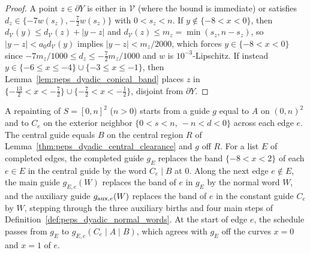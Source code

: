 \begin{proof}\leanok
    A point $z\in\partial Y$ is either in $\mathcal V$ (where the bound is
    immediate) or satisfies $d_z\in\{-7w(s_z),-\tfrac72w(s_z)\}$ with $0<s_z<n$.
    If $y\notin\{-8<x<0\}$, then $d_{\mathcal V}(y)\le d_{\mathcal V}(z)+|y-z|$
    and $d_{\mathcal V}(z)\le m_z=\min(s_z,n-s_z)$, so
    $|y-z|<a_0d_{\mathcal V}(y)$ implies $|y-z|<m_z/2000$, which forces
    $y\in\{-8<x<0\}$ since $-7m_z/1000\le d_z\le-\tfrac72m_z/1000$ and $w$ is
    $10^{-3}$-Lipschitz. If instead
    $y\in\{-6\le x\le-4\}\cup\{-3\le x\le-1\}$, then
    Lemma~\ref{lem:peps_dyadic_conical_band} places $z$ in
    $\{-\tfrac{13}2<x<-\tfrac72\}\cup\{-\tfrac72<x<-\tfrac12\}$, disjoint from
    $\partial Y$.
\end{proof}

\begin{definition}
    \label{def:peps_dyadic_schedule}
    \leanok
    A repainting of $S=[0,n]^2$ ($n>0$) starts from a guide $g$ equal to $A$ on
    $(0,n)^2$ and to $C_e$ on the exterior neighbor $\{0<s<n,\ -n<d<0\}$ across
    each edge $e$. The central guide equals $B$ on the central region $R$ of
    Lemma~\ref{thm:peps_dyadic_central_clearance} and $g$ off $R$. For a list
    $E$ of completed edges, the completed guide $g_E$ replaces the band
    $\{-8<x<2\}$ of each $e\in E$ in the central guide by the word $C_e\mid B$ at
    $0$. Along the next edge $e\notin E$, the main guide $g_{E,e}(W)$ replaces the
    band of $e$ in $g_E$ by the normal word $W$, and the auxiliary guide
    $g_{{\rm aux},e}(W)$ replaces the band of $e$ in the constant guide $C_e$ by
    $W$, stepping through the three auxiliary births and four main steps of
    Definition~\ref{def:peps_dyadic_normal_words}. At the start of edge $e$, the
    schedule passes from $g_E$ to $g_{E,e}(C_e\mid A\mid B)$, which agrees with
    $g_E$ off the curves $x=0$ and $x=1$ of $e$.
\end{definition}

